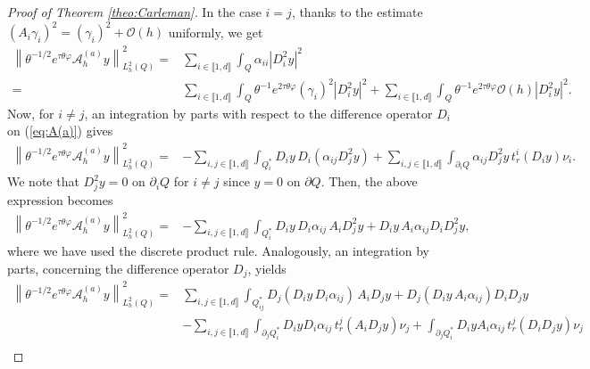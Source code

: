\documentclass{amsart}
\numberwithin{equation}{section}
\begin{document}
\begin{proof}[Proof of Theorem \ref{theo:Carleman}]
In the case $i=j$, thanks to the estimate $(A_{i}\gamma_{i})^{2}=(\gamma_{i})^{2}+\mathcal{O}(h)$ uniformly,
we get
\begin{equation}\label{A:a:i=j}
\begin{aligned}
\left\|\theta^{-1/2}e^{\tau\theta\varphi}\mathcal{A}^{(a)}_{h}y\right\|^{2}_{L_{h}^{2}(Q)}=&\sum_{i\in\llbracket 1,d\rrbracket}\int_{Q}\alpha_{ii} |D_{i}^{2}y|^{2}\\
=&\sum_{i\in\llbracket 1,d\rrbracket}\int_{Q}\theta^{-1} e^{2\tau\theta\varphi}(\gamma_{i})^{2}|D_{i}^{2}y|^{2}+\sum_{i\in\llbracket 1,d\rrbracket}\int_{Q}\theta^{-1} e^{2\tau\theta\varphi}\mathcal{O}(h)|D_{i}^{2}y|^{2}.
\end{aligned}
\end{equation}
Now, for $i\ne j$, an integration by parts with respect to the difference operator $D_{i}$ on (\ref{eq:A(a)}) gives
\begin{equation*}
    \begin{aligned}
        \left\|\theta^{-1/2}e^{\tau\theta\varphi}\mathcal{A}^{(a)}_{h}y\right\|^{2}_{L_{h}^{2}(Q)}=&-\sum_{i,j\in\llbracket 1,d\rrbracket}\int_{Q^{\ast}_{i}} D_{i}y\,D_{i}(\alpha_{ij} D_{j}^{2}y)+\sum_{i,j\in\llbracket 1,d\rrbracket}\int_{\partial_{i}Q}\alpha_{ij} D_{j}^{2}y\,t_{r}^{i}(D_{i}y)\nu_{i}.
\end{aligned}
\end{equation*}
We note that $D_{j}^{2}y=0$ on $\partial_{i}Q$ for $i\ne j$ since $y=0$ on $\partial Q$. Then, the above expression becomes
\begin{equation*}
\begin{aligned}
\left\|\theta^{-1/2}e^{\tau\theta\varphi}\mathcal{A}^{(a)}_{h}y\right\|^{2}_{L_{h}^{2}(Q)}=&-\sum_{i,j\in\llbracket 1,d\rrbracket}\int_{Q^{\ast}_{i}} D_{i}y\,D_{i}\alpha_{ij} \,A_{i}D_{j}^{2}y+D_{i}y\,A_{i}\alpha_{ij} D_{i}D_{j}^{2}y,
           \end{aligned}
\end{equation*}
where we have used the discrete product rule. Analogously, an integration by parts, concerning the difference operator $D_{j}$, yields
\begin{equation*}
    \begin{aligned}
        \left\|\theta^{-1/2}e^{\tau\theta\varphi}\mathcal{A}^{(a)}_{h}y\right\|^{2}_{L_{h}^{2}(Q)}=&\sum_{i,j\in\llbracket 1,d\rrbracket}\int_{Q_{ij}^{\ast}} D_{j}(D_{i}y\,D_{i}\alpha_{ij}) \,A_{i}D_{j}y+D_{j}(D_{i}y\,A_{i}\alpha_{ij}) D_{i}D_{j}y\\
        &-\sum_{i,j\in\llbracket 1,d\rrbracket}\int_{\partial_{j}Q_{i}^{\ast}}D_{i}yD_{i}\alpha_{ij}\, t_{r}^{j}(A_{i}D_{j}y)\nu_{j}+\int_{\partial_{j}Q_{i}^{\ast}}D_{i}yA_{i}\alpha_{ij}\, t_{r}^{j}(D_{i}D_{j}y)\nu_{j}\\

\end{aligned}
\end{equation*}
\end{proof}
\end{document}
